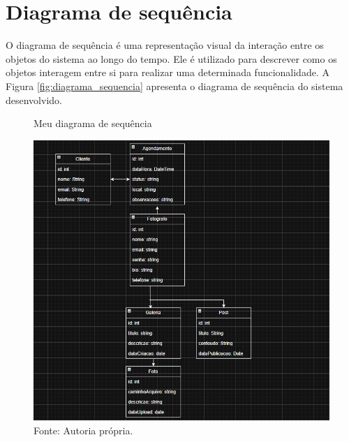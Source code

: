 \section{Diagrama de sequência}
\label{sec:sequencia}   
O diagrama de sequência é uma representação visual da interação entre os objetos do sistema ao longo do tempo. Ele é utilizado para descrever como os objetos interagem entre si para realizar uma determinada funcionalidade. A Figura \ref{fig:diagrama_sequencia} apresenta o diagrama de sequência do sistema desenvolvido. 
\begin{figure} [h!]	
    \centering
    \caption{Meu diagrama de sequência}
    \includegraphics[width=1.1\textwidth]{Figures/Diagrama_de_Classes.png}
    \caption*{Fonte: Autoria própria.}
    \label{fig:diagrama_de_sequencia}
\end{figure}







